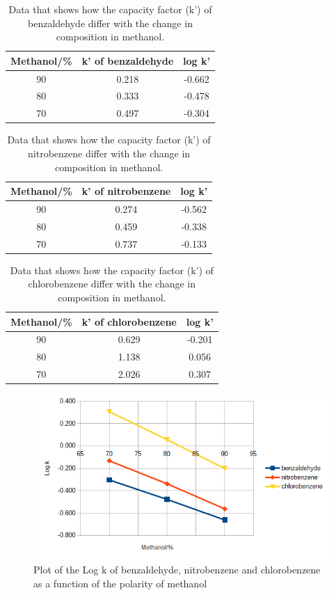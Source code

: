 \documentclass[a4paper, 12pt]{article}
\begin{document}
\begin{table}[h!]
	\centering
	\caption{Data that shows how the capacity factor (k') of benzaldehyde differ with the change in composition in methanol.}
	\begin{tabular}{|c|c|c|}
		\hline
		Methanol/\% & k' of benzaldehyde & log k' \\
		\hline
		90 & 0.218 & -0.662 \\
		\hline
		80 & 0.333 & -0.478 \\
		\hline
		70 & 0.497 & -0.304 \\
		\hline
	\end{tabular}
	\label{tab-cf-benzaldehyde}
\end{table}

\begin{table}[h!]
	\centering
	\caption{Data that shows how the capacity factor (k') of nitrobenzene differ with the change in composition in methanol.}
	\begin{tabular}{|c|c|c|}
		\hline
		Methanol/\% & k' of nitrobenzene & log k' \\
		\hline
		90 & 0.274 & -0.562 \\
		\hline
		80 & 0.459 & -0.338 \\
		\hline
		70 & 0.737 & -0.133 \\
		\hline
	\end{tabular}
	\label{tab-cf-nitrobenzene}
\end{table}

\begin{table}[h!]
	\centering
	\caption{Data that shows how the capacity factor (k') of chlorobenzene differ with the change in composition in methanol.}
	\begin{tabular}{|c|c|c|}
		\hline
		Methanol/\% & k' of chlorobenzene & log k' \\
		\hline
		90 & 0.629 & -0.201 \\
		\hline
		80 & 1.138 & 0.056 \\
		\hline
		70 & 2.026 & 0.307 \\
		\hline
	\end{tabular}
	\label{tab-cf-chlorobenzene}
\end{table}

\begin{figure}[h!]
	\centering
	\includegraphics[width=1\textwidth]{fig-capacity-2}
	\caption{Plot of the Log k of benzaldehyde, nitrobenzene and chlorobenzene as a function of the polarity of methanol}
	\label{fig-capacity-factors}
\end{figure}
\end{document}
